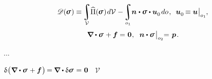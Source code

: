 \nopagebreak\begin{equation}\label{complementaryenergyfunctional}
\complementaryenergyfunctional (\hspace{-0.1ex}\linearstress\hspace{.1ex}) \equiv \hspace{-0.2ex}
\displaystyle\integral\displaylimits_{\mathcal{V}} \hspace{-0.5ex}
\widehat{\potential}(\hspace{-0.1ex}\linearstress\hspace{.1ex}) \hspace{.2ex} d\mathcal{V} \hspace{.1ex}
- \hspace{-0.2ex}
\displaystyle\integral\displaylimits_{o_1} \hspace{-0.5ex}
\unitnormalvector \hspace{.1ex} \dotp \linearstress \dotp \bm{u}_{\raisemath{-0.1em}{0}} \hspace{.25ex} do
\hspace{.2ex} ,
\hspace{.5em}
\bm{u}_{\raisemath{-0.1em}{0}} \hspace{-0.2ex} \equiv \bm{u} \hspace{.1ex} \bigr|_{o_1}
\hspace{-0.1ex} ,
\end{equation}
%
\nopagebreak\vspace{-0.4em}\begin{equation*}
\boldnabla \dotp \linearstress \hspace{.15ex} + \bm{f} = \hspace{.1ex} \bm{0} \hspace{.1ex} ,
\hspace{.6em}
\unitnormalvector \dotp \linearstress \hspace{.2ex} \bigr|_{o_2} \hspace{-0.66ex} = \hspace{.2ex} \bm{p}
\hspace{.2ex} .
\end{equation*}

...

${
\variation{\hspace{.1ex} \bigl( \hspace{.1ex} \boldnabla \dotp \linearstress \hspace{.15ex} + \bm{f} \hspace{.15ex} \bigr)} \hspace{-0.2ex}
= \hspace{-0.1ex} \boldnabla \dotp \variation{\linearstress} \hspace{.15ex}
= \hspace{.1ex} \bm{0}
}$ ~$\mathcal{V}$

